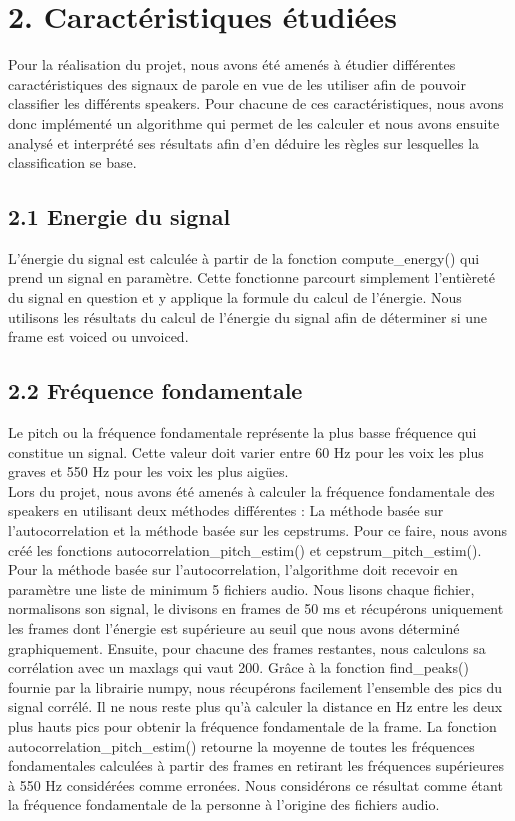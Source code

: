 \documentclass[a4paper,12pt]{report}	%
\begin{document}
{\section*{2. Caractéristiques étudiées}}
Pour la réalisation du projet, nous avons été amenés à étudier différentes caractéristiques des signaux de parole en vue de les utiliser afin de pouvoir classifier les différents speakers. Pour chacune de ces caractéristiques, nous avons donc implémenté un algorithme qui permet de les calculer et nous avons ensuite analysé et interprété ses résultats afin d'en déduire les règles sur lesquelles la classification se base.

{\subsection*{2.1 Energie du signal}}
L'énergie du signal est calculée à partir de la fonction compute\_energy() qui prend un signal en paramètre. Cette fonctionne parcourt simplement l'entièreté du signal en question et y applique la formule du calcul de l'énergie. Nous utilisons les résultats du calcul de l'énergie du signal afin de déterminer si une frame est voiced ou unvoiced.
{\subsection*{2.2 Fréquence fondamentale}}
Le pitch ou la fréquence fondamentale représente la plus basse fréquence qui constitue un signal. Cette valeur doit varier entre 60 Hz pour les voix les plus graves et 550 Hz pour les voix les plus aigües. \\
Lors du projet, nous avons été amenés à calculer la fréquence fondamentale des speakers en utilisant deux méthodes différentes : La méthode basée sur l'autocorrelation et la méthode basée sur les cepstrums. Pour ce faire, nous avons créé les fonctions autocorrelation\_pitch\_estim() et cepstrum\_pitch\_estim(). \\
Pour la méthode basée sur l'autocorrelation, l'algorithme doit recevoir en paramètre une liste de minimum 5 fichiers audio. Nous lisons chaque fichier, normalisons son signal, le divisons en frames de 50 ms et récupérons uniquement les frames dont l'énergie est supérieure au seuil que nous avons déterminé graphiquement. Ensuite, pour chacune des frames restantes, nous calculons sa corrélation avec un maxlags qui vaut 200. Grâce à la fonction find\_peaks() fournie par la librairie numpy, nous récupérons facilement l'ensemble des pics du signal corrélé. Il ne nous reste plus qu'à calculer la distance en Hz entre les deux plus hauts pics pour obtenir la fréquence fondamentale de la frame. La fonction autocorrelation\_pitch\_estim() retourne la moyenne de toutes les fréquences fondamentales calculées à partir des frames en retirant les fréquences supérieures à 550 Hz considérées comme erronées. Nous considérons ce résultat comme étant la fréquence fondamentale de la personne à l'origine des fichiers audio. \\
\end{document}
